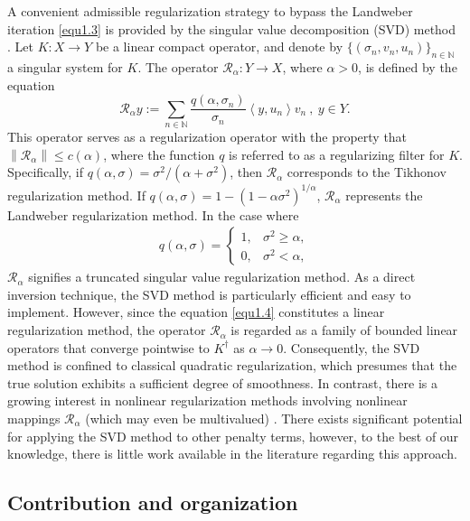 \documentclass[a4paper,12pt]{article}
\numberwithin{equation}{section}
\begin{document}
A convenient admissible regularization strategy to bypass the Landweber iteration \eqref{equ1.3} is provided by the singular value decomposition (SVD) method \cite{EHN1996,K1996}. Let $K:X\rightarrow Y$ be a linear compact operator, and denote by $\{(\sigma_{n},v_{n},u_{n})\}_{n\in\mathbb{N}}$ a singular system for $K$. The operator $\mathcal{R}_{\alpha}:Y\rightarrow X$, where $\alpha>0$, is defined by the equation
\begin{equation}\label{equ1.4}
    \mathcal{R}_{\alpha}y:=\sum_{n\in\mathbb{N}}\frac{q\left(\alpha, \sigma_n\right)}{\sigma_{n}}\left<y,u_{n}\right>v_{n}\ ,\ y\in Y.
\end{equation}
This operator serves as a regularization operator with the property that $\left\|\mathcal{R}_{\alpha}\right\|\leq c(\alpha)$, where the function $q$ is referred to as a regularizing filter for $K$. Specifically, if $q(\alpha, \sigma)=\sigma^2/(\alpha+\sigma^2)$, then $\mathcal{R}_{\alpha}$ corresponds to the Tikhonov regularization method. If $q(\alpha, \sigma)=1-(1-\alpha\sigma^2)^{1/\alpha}$, $\mathcal{R}_{\alpha}$ represents the Landweber regularization method. In the case where
\begin{align*}
    q(\alpha, \sigma)=
    \left\{             
             \begin{array}{ll}
             1, &  \sigma^2\ge\alpha, \\
             0, &  \sigma^2<\alpha, 
             \end{array}
    \right.
\end{align*}
$\mathcal{R}_{\alpha}$ signifies a truncated singular value regularization method. As a direct inversion technique, the SVD method is particularly efficient and easy to implement. However, since the equation \eqref{equ1.4} constitutes a linear regularization method, the operator $\mathcal{R}_{\alpha}$ is regarded as a family of bounded linear operators that converge pointwise to $K^{\dag}$ as $\alpha\rightarrow 0$. Consequently, the SVD method is confined to classical quadratic regularization, which presumes that the true solution exhibits a sufficient degree of smoothness. In contrast, there is a growing interest in nonlinear regularization methods involving nonlinear mappings $\mathcal{R}_{\alpha}$ (which may even be multivalued) \cite{BB18}. There exists significant potential for applying the SVD method to other penalty terms, however, to the best of our knowledge, there is little work available in the literature regarding this approach.

\subsection{Contribution and organization}
\end{document}
